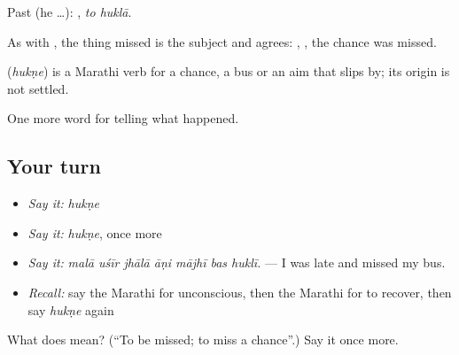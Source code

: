 Past (he …):  , \emph{to huklā}.

As with , the thing missed is the subject and agrees:  ,  , the chance was missed.

\begin{cousinweb}
\textbf{} (\emph{hukṇe}) is a Marathi verb for a chance, a bus or an aim that slips by; its origin is not settled.
\end{cousinweb}

\begin{grammarlens}[title={What you've built}]
One more word for telling what happened.
\end{grammarlens}

\subsection*{Your turn}
\begin{itemize}
\raggedright
  \item \emph{Say it:} \emph{hukṇe}
  \item \emph{Say it:} \emph{hukṇe}, once more
  \item \emph{Say it:} \emph{malā uśīr jhālā āṇi mājhī bas huklī.} — I was late and missed my bus.
  \item \emph{Recall:} say the Marathi for unconscious, then the Marathi for to recover, then say \emph{hukṇe} again
\end{itemize}

\begin{tcolorbox}[breakable,colback=teal!4,colframe=teal!35!black,title={Before you move on}]
What does  mean? (\textquotedblleft{}To be missed; to miss a chance\textquotedblright{}.) Say it once more.
\end{tcolorbox}
